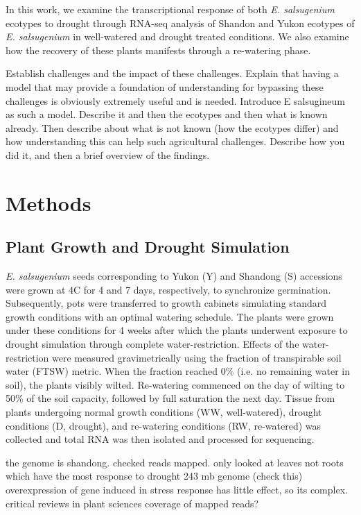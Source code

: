 \documentclass[12pt]{article}
\newcommand{\esal}{\textit{E. salsugenium}}
\begin{document}
	In this work, we examine the transcriptional response of both \esal{} ecotypes to drought through RNA-seq analysis of Shandon and Yukon ecotypes of \esal{} in well-watered and drought treated conditions. We also examine how the recovery of these plants manifests through a re-watering phase. 


	Establish challenges and the impact of these challenges. Explain that having a model that may provide a foundation of understanding for bypassing these challenges is obviously extremely useful and is needed. Introduce E salsugineum as such a model. Describe it and then the ecotypes and then what is known already. Then describe about what is not known (how the ecotypes differ) and how understanding this can help such agricultural challenges. Describe how you did it, and then a brief overview of the findings.
	
	

	\section{Methods}
	\label{methods}
	\subsection{Plant Growth and Drought Simulation}
	\esal{} seeds corresponding to Yukon (Y) and Shandong (S) accessions were grown at 4\degree C for 4 and 7 days, respectively, to synchronize germination. Subsequently, pots were transferred to growth cabinets simulating standard growth conditions with an optimal watering schedule. The plants were grown under these conditions for 4 weeks after which the plants underwent exposure to drought simulation through complete water-restriction. Effects of the water-restriction were measured gravimetrically using the fraction of transpirable soil water (FTSW) metric. When the fraction reached 0\% (i.e. no remaining water in soil), the plants visibly wilted. Re-watering commenced on the day of wilting to 50\% of the soil capacity, followed by full saturation the next day. Tissue from plants undergoing normal growth conditions (WW, well-watered), drought conditions (D, drought), and re-watering conditions (RW, re-watered) was collected and total RNA was then isolated and processed for sequencing. 
	

	the genome is shandong. checked reads mapped.
	only looked at leaves not roots which have the most response to drought
	243 mb genome (check this)
	overexpression of gene induced in stress response has little effect, so its complex. critical reviews in plant sciences
	coverage of mapped reads?
\end{document}
